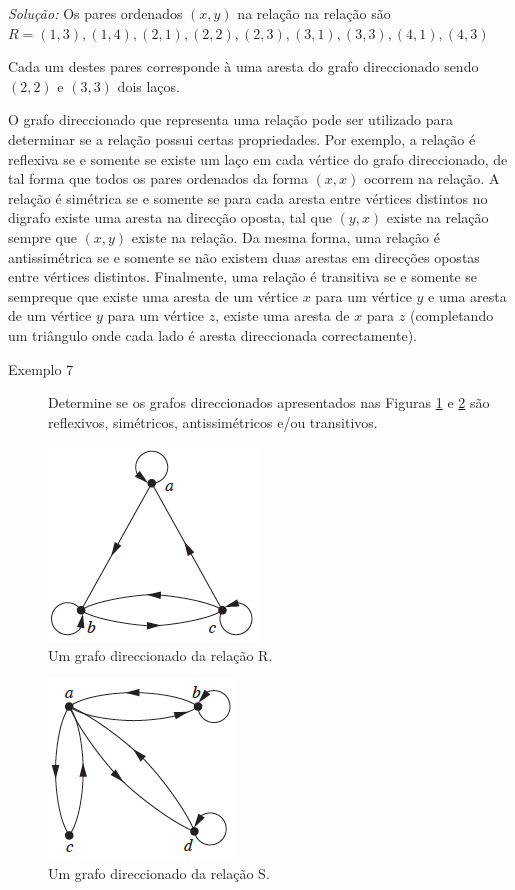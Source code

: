 \emph{Solução:} Os pares ordenados $(x,y)$ na relação na relação são\\
$R = {(1, 3), (1, 4), (2, 1), (2, 2), (2, 3), (3, 1), (3, 3), (4, 1), (4, 3)}$

Cada um destes pares corresponde à uma aresta do grafo direccionado sendo $(2,2)$ e $(3,3)$ dois laços.

O grafo direccionado que representa uma relação pode ser utilizado para determinar se a relação possui certas propriedades.
Por exemplo, a relação é reflexiva se e somente se existe um laço em cada vértice do grafo direccionado, de tal forma que
todos os pares ordenados da forma $(x,x)$ ocorrem na relação. A relação é simétrica se e somente se para cada aresta entre vértices
distintos no digrafo existe uma aresta na direcção oposta, tal que $(y,x)$ existe na relação sempre que $(x,y)$ existe na
relação. Da mesma forma, uma relação é antissimétrica se e somente se não existem duas arestas
em direcções opostas entre vértices distintos. Finalmente, uma relação é transitiva se e somente se sempreque
que existe uma aresta de um vértice $x$ para um vértice $y$ e uma aresta de um vértice $y$ para um vértice $z$, existe uma
aresta de $x$ para $z$ (completando um triângulo onde cada lado é aresta direccionada correctamente).


\begin{description}
	\item[Exemplo 7]{Determine se os grafos direccionados apresentados nas Figuras \ref{Figura66} e \ref{Figura67} são
	reflexivos, simétricos, antissimétricos e/ou transitivos}.
\end{description}

\begin{figure}[H]
	\centering
	\includegraphics[scale=0.75]{aulas/imagens/66}
	\caption{Um grafo direccionado da relação R.}
	\label{Figura66}
\end{figure}

\begin{figure}[H]
	\centering
	\includegraphics[scale=0.75]{aulas/imagens/67}
	\caption{Um grafo direccionado da relação S.}
	\label{Figura67}
\end{figure}

